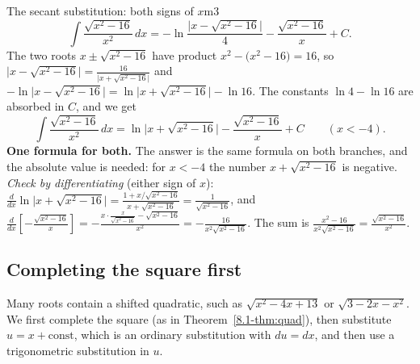 \documentclass[11pt]{article}
\begin{document}
\begin{exmp}{The secant substitution: both signs of $x$}{m3}
\[\int\frac{\sqrt{x^2-16}}{x^2}\,dx=-\ln\frac{\lvert x-\sqrt{x^2-16}\rvert}4-\frac{\sqrt{x^2-16}}x+C .\]
The two roots $x\pm\sqrt{x^2-16}$ have product $x^2-\big(x^2-16\big)=16$, so $\lvert x-\sqrt{x^2-16}\rvert=\frac{16}{\lvert x+\sqrt{x^2-16}\rvert}$ and $-\ln\lvert x-\sqrt{x^2-16}\rvert=\ln\lvert x+\sqrt{x^2-16}\rvert-\ln16$. The constants $\ln4-\ln16$ are absorbed in $C$, and we get
\[\int\frac{\sqrt{x^2-16}}{x^2}\,dx=\ln\big\lvert x+\sqrt{x^2-16}\big\rvert-\frac{\sqrt{x^2-16}}x+C\qquad(x<-4).\]
\textbf{One formula for both.} The answer is the same formula on both branches, and the absolute value is needed: for $x<-4$ the number $x+\sqrt{x^2-16}$ is negative. \emph{Check by differentiating} (either sign of $x$): $\frac{d}{dx}\ln\lvert x+\sqrt{x^2-16}\rvert=\frac{1+x/\sqrt{x^2-16}}{x+\sqrt{x^2-16}}=\frac1{\sqrt{x^2-16}}$, and $\frac{d}{dx}\left[-\frac{\sqrt{x^2-16}}x\right]=-\frac{x\cdot\frac x{\sqrt{x^2-16}}-\sqrt{x^2-16}}{x^2}=-\frac{16}{x^2\sqrt{x^2-16}}$. The sum is $\frac{x^2-16}{x^2\sqrt{x^2-16}}=\frac{\sqrt{x^2-16}}{x^2}$.
\end{exmp}

\subsection*{Completing the square first}

Many roots contain a shifted quadratic, such as $\sqrt{x^2-4x+13}$ or $\sqrt{3-2x-x^2}$. We first complete the square (as in Theorem~\ref{8.1-thm:quad}), then substitute $u=x+\text{const}$, which is an ordinary substitution with $du=dx$, and then use a trigonometric substitution in $u$.
\end{document}
